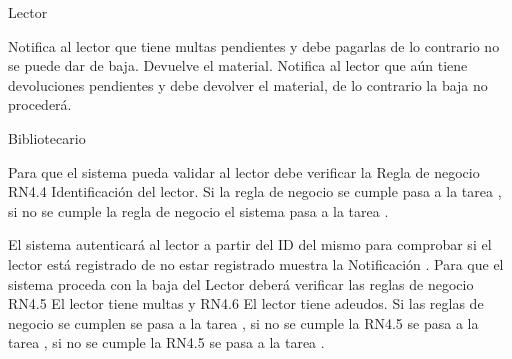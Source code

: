 \begin{PDescripcion}

  \Ppaso Lector

    \begin{enumerate}

      \Ppaso[\itarea] Notifica al lector que tiene multas pendientes y debe pagarlas de lo contrario no se puede dar de baja.
      \Ppaso[\itarea] Devuelve el material. Notifica al lector que aún tiene devoluciones pendientes y debe devolver el material, de lo contrario la baja no procederá.

    \end{enumerate}

  \Ppaso Bibliotecario

    \begin{enumerate}

      \Ppaso[\itarea]  Para que el sistema pueda validar al lector debe verificar la Regla de negocio RN4.4 Identificación del lector. Si la regla de negocio se cumple pasa a la tarea , si no se cumple la regla de negocio el sistema pasa a la tarea .



      \Ppaso[\itarea]  El sistema autenticará al lector a partir del ID del mismo para comprobar si el lector está registrado de no estar registrado muestra la Notificación .
      \Ppaso[\itarea] Para que el sistema proceda con la baja del Lector deberá verificar las reglas de negocio RN4.5 El lector tiene multas y RN4.6 El lector tiene adeudos. Si las reglas de negocio se cumplen se pasa a la tarea , si no se cumple la RN4.5 se pasa a la tarea , si no se cumple la RN4.5 se pasa a la tarea .


\end{enumerate}
\end{PDescripcion}
